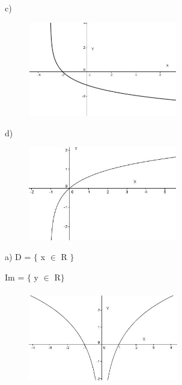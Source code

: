 \begin{respostas}{7}
c)\begin{figure}[H]
	\begin{Center}
		\includegraphics[width=2.56in,height=1.62in]{capitulos/logaritmos_e_funcao_logaritmica/media/image32.JPG}
	\end{Center}
\end{figure}

d)\begin{figure}[H]
	\begin{Center}
		\includegraphics[width=2.55in,height=1.61in]{capitulos/logaritmos_e_funcao_logaritmica/media/image33.JPG}
	\end{Center}
\end{figure}


\ansitem{} 

a)
D = $ \{ $  x $ \in $ R $ \} $ 

Im = $ \{ $  y $ \in $ R$ \} $ 

\begin{figure}[H]
	\begin{Center}
		\includegraphics[width=2.57in,height=1.6in]{capitulos/logaritmos_e_funcao_logaritmica/media/image34.JPG}
	\end{Center}
\end{figure}


\end{respostas}
